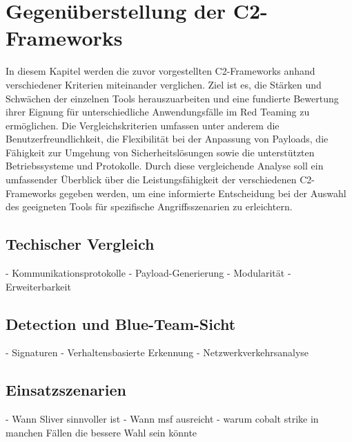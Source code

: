 \section{Gegenüberstellung der C2-Frameworks}
In diesem Kapitel werden die zuvor vorgestellten C2-Frameworks anhand verschiedener Kriterien miteinander verglichen. Ziel ist es, die Stärken und Schwächen der einzelnen Tools herauszuarbeiten und eine fundierte Bewertung ihrer Eignung für unterschiedliche Anwendungsfälle im Red Teaming zu ermöglichen. Die Vergleichskriterien umfassen unter anderem die Benutzerfreundlichkeit, die Flexibilität bei der Anpassung von Payloads, die Fähigkeit zur Umgehung von Sicherheitslösungen sowie die unterstützten Betriebssysteme und Protokolle. Durch diese vergleichende Analyse soll ein umfassender Überblick über die Leistungsfähigkeit der verschiedenen C2-Frameworks gegeben werden, um eine informierte Entscheidung bei der Auswahl des geeigneten Tools für spezifische Angriffsszenarien zu erleichtern.
\subsection{Techischer Vergleich}
- Kommunikationsprotokolle
- Payload-Generierung
- Modularität
- Erweiterbarkeit
\subsection{Detection und Blue-Team-Sicht}
- Signaturen
- Verhaltensbasierte Erkennung
- Netzwerkverkehrsanalyse
\subsection{Einsatzszenarien}
- Wann Sliver sinnvoller ist
- Wann msf ausreicht
- warum cobalt strike in manchen Fällen die bessere Wahl sein könnte